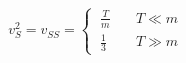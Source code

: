 \begin{equation}
v_S^2=v_{SS}=\left\{\ \begin{array}{ll} \frac Tm&\quad T\ll m\\[1.5mm]
      \frac 13 &\quad T\gg m \end{array}\right.
\end{equation}

